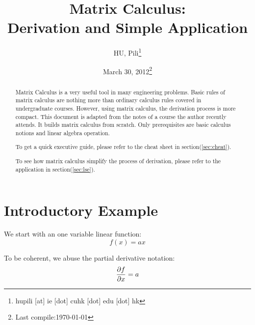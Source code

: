 


\author{HU, Pili\thanks{hupili [at] ie [dot] cuhk [dot] edu [dot] hk}}

\title{Matrix Calculus: \\ Derivation and Simple Application}
\date{March 30, 2012\thanks{Last compile:\today}}



\maketitle
\begin{abstract}
	Matrix Calculus\cite{wiki_mc} is a very useful tool in many 
	engineering problems. Basic rules of matrix calculus are 
	nothing more than ordinary calculus rules covered in 
	undergraduate courses. However, using matrix calculus, 
	the derivation process is more compact. This document is 
	adapted from the notes of a course the author recently attends.
	It builds matrix calculus from scratch. Only prerequisites 
	are basic calculus notions and linear algebra operation.  
	
	To get a quick executive guide, please refer to the cheat 
	sheet in section(\ref{sec:cheat}). 
	
	To see how matrix calculus simplify the process of derivation, please 
	refer to the application in section(\ref{sec:lse}). 
\end{abstract}

\pagebreak
\setcounter{tocdepth}{2}
\tableofcontents
\pagebreak

\section{Introductory Example}

We start with an one variable linear function:
\begin{equation}
	f(x) = ax
\end{equation}

To be coherent, we abuse the partial derivative notation:
\begin{equation}
	\dfrac{\partial f}{\partial x} = a
	\label{eq:fax-single}
\end{equation}

